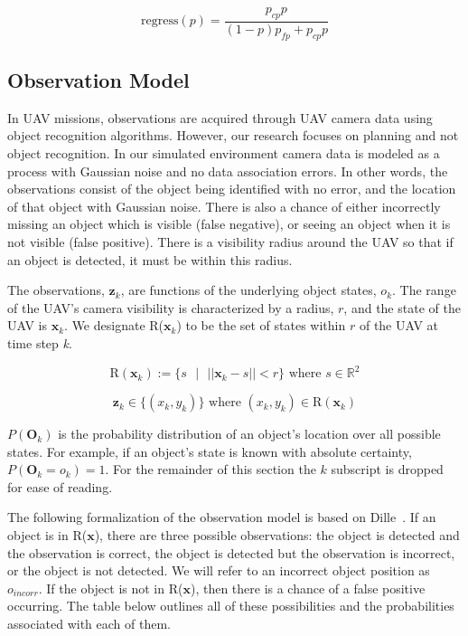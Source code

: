 \documentclass[12pt]{article}
\begin{document}
\begin{equation}
\text{regress}(p) = \frac{p_{cp}p}{(1-p)p_{fp} + p_{cp}p}
\end{equation}

\subsection{Observation Model} \label{uav domain observation}

In UAV missions, observations are acquired through UAV camera data using object recognition algorithms. However, our research focuses on planning and not object recognition. In our simulated environment camera data is modeled as a process with Gaussian noise and no data association errors. In other words, the observations consist of the object being identified with no error, and the location of that object with Gaussian noise. There is also a chance of either incorrectly missing an object which is visible (false negative), or seeing an object when it is not visible (false positive). There is a visibility radius around the UAV so that if an object is detected, it must be within this radius. 

The observations, $\mathbf{z}_{k}$, are functions of the underlying object states, $o_{k}$. The range of the UAV's camera visibility is characterized by a radius, $r$, and the state of the UAV is $\mathbf{x}_{k}$. We designate R($\mathbf{x}_{k}$) to be the set of states within $r$ of the UAV at time step \textit{k}. 

\begin{equation}
\text{R}(\mathbf{x}_{k}) := \{s\text{ } | \text{ } ||\mathbf{x}_{k} -  s|| < r\} \text{ where } s \in \mathbb{R}^{2}
\end{equation}

\begin{equation}
\mathbf{z}_{k} \in \{ (x_{k},y_{k})\} \text{   where   }  (x_{k},y_{k}) \in \text{R}(\mathbf{x}_{k})
\end{equation}

$P(\mathbf{O}_{k})$ is the probability distribution of an object's location over all possible states. 
For example, if an object's state is known with absolute certainty, $P(\mathbf{O}_{k} = o_{k}) = 1$. For the remainder of this section the $k$ subscript is dropped for ease of reading.

The following formalization of the observation model is based on Dille~\cite{dille2013search}. If an object is in R($\mathbf{x}$), there are three possible observations: the object is detected and the observation is correct, the object is detected but the observation is incorrect, or the object is not detected. We will refer to an incorrect object position as $o_{incorr}$. If the object is not in R($\mathbf{x}$), then there is a chance of a false positive occurring. The table below outlines all of these possibilities and the probabilities associated with each of them.
\end{document}
